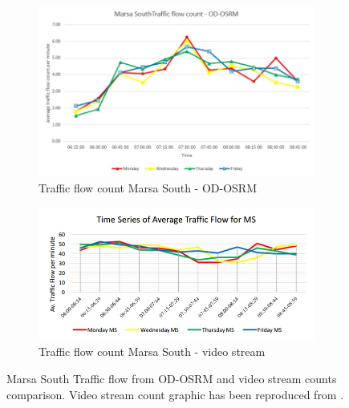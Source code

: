 \documentclass[12pt, a4paper]{report}
\theoremstyle{definition}
\theoremstyle{definition}%
\theoremstyle{definition}%
\theoremstyle{definition}%
\theoremstyle{definition}%
\theoremstyle{definition}%
\begin{document}
\begin{figure}[!] 
	\centering
	\begin{subfigure}{0.8\textwidth}
		\centering
		\includegraphics[width=\linewidth]{traffic_flow_count_MS_MINE.jpg} 
		\caption{\scriptsize{Traffic flow count Marsa South - OD-OSRM}} 
		\label{fig:traffic_flow_count_MS_MINE}
	\end{subfigure}
	
	\vspace{1cm}
	\begin{subfigure}{0.8\textwidth}
		\centering
		\includegraphics[width=\linewidth]{traffic_flow_count_MS_Nigel_pace.jpg} 
		\caption{\scriptsize{Traffic flow count Marsa South - video stream}}
		\label{fig:traffic_flow_count_MS_NP}
	\end{subfigure}
	
	\caption[Line chart for Marsa northbound and southbound traffic flow]{Marsa South Traffic flow from OD-OSRM and video stream counts comparison. Video stream count graphic has been reproduced from \cite{Pace2017}.}
	\label{fig:marsa_south_traffic_flow_line_chart}
\end{figure}
\end{document}
